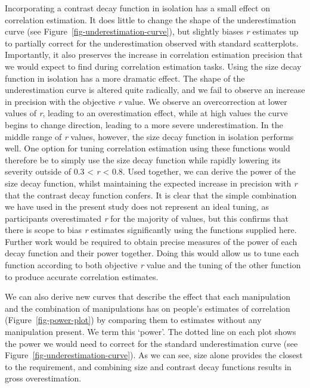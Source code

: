 \documentclass[manuscript, review, anonymous, screen]{acmart}
\begin{document}
Incorporating a contrast decay function in isolation has a small effect
on correlation estimation. It does little to change the shape of the
underestimation curve (see Figure~\ref{fig-underestimation-curve}), but
slightly biases \emph{r} estimates up to partially correct for the
underestimation observed with standard scatterplots. Importantly, it
also preserves the increase in correlation estimation precision that we
would expect to find during correlation estimation tasks. Using the size
decay function in isolation has a more dramatic effect. The shape of the
underestimation curve is altered quite radically, and we fail to observe
an increase in precision with the objective \emph{r} value. We observe
an overcorrection at lower values of \emph{r}, leading to an
overestimation effect, while at high values the curve begins to change
direction, leading to a more severe underestimation. In the middle range
of \emph{r} values, however, the size decay function in isolation
performs well. One option for tuning correlation estimation using these
functions would therefore be to simply use the size decay function while
rapidly lowering its severity outside of 0.3 \textless{} \emph{r}
\textless{} 0.8. Used together, we can derive the power of the size
decay function, whilst maintaining the expected increase in precision
with \emph{r} that the contrast decay function confers. It is clear that
the simple combination we have used in the present study does not
represent an ideal tuning, as participants overestimated \emph{r} for
the majority of values, but this confirms that there is scope to bias
\emph{r} estimates significantly using the functions supplied here.
Further work would be required to obtain precise measures of the power
of each decay function and their power together. Doing this would allow
us to tune each function according to both objective \emph{r} value and
the tuning of the other function to produce accurate correlation
estimates.

We can also derive new curves that describe the effect that each
manipulation and the combination of manipulations has on people's
estimates of correlation (Figure~\ref{fig-power-plot}) by comparing them
to estimates without any manipulation present. We term this `power'. The
dotted line on each plot shows the power we would need to correct for
the standard underestimation curve (see
Figure~\ref{fig-underestimation-curve}). As we can see, size alone
provides the closest to the requirement, and combining size and contrast
decay functions results in gross overestimation.
\end{document}
